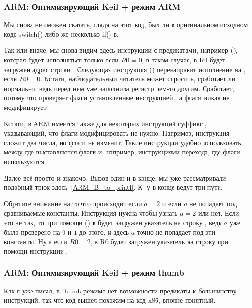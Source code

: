 ﻿%
\subsubsection{ARM: Оптимизирующий Keil + режим ARM}



Мы снова не сможем сказать, глядя на этот код, был ли в оригинальном исходном коде switch() либо же несколько
if()-в.

Так или иначе, мы снова видим здесь инструкции с предикатами, например  (), 
которая будет исполняться только
если $R0=0$, в таком случае, в R0 будет загружен адрес строки . 
Следующая инструкция  () перенаправит
исполнение на , если $R0=0$. 
Кстати, наблюдательный читатель может спросить, сработает ли  нормально,
ведь  перед ним уже заполнила регистр  чем-то другим. 
Сработает, потому что  проверяет флаги установленные
инструкцией \CMP, а  флаги никак не модифицирует.

Кстати, в ARM имеется также для некоторых инструкций суффикс , указывающий, что флаги модифицировать не нужно.
Например, инструкция  сложит два числа, но флаги не изменит. Такие инструкции удобно использовать
между \CMP где выставляются флаги и, например, инструкциями перехода, где флаги используются.

Далее всё просто и знакомо. Вызов \printf один и в конце, мы уже рассматривали подобный трюк 
здесь~\ref{ARM_B_to_printf}. К \printf{}-у в конце ведут три пути. 

Обратите внимание на то что происходит
если $a=2$ и если $a$ не попадает под сравниваемые константы. Инструкция  нужна чтобы узнать
$a=2$ или нет. Если это не так, то при помощи  () в  будет загружен указатель на 
строку ,
ведь $a$ уже было проверено на $0$ и $1$ до этого, и здесь $a$ точно не попадает под эти константы. 
Ну а если $R0=2$,
в R0 будет загружен указатель на строку  при помощи инструкции .

\subsubsection{ARM: Оптимизирующий Keil + режим thumb}



Как я уже писал, в thumb-режиме нет возможности  предикаты к большинству инструкций,
так что код вышел похожим на код x86, вполне понятный.


